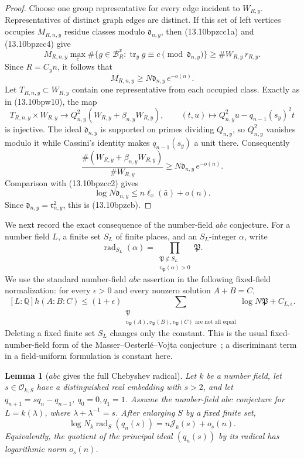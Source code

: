 \documentclass[11pt,reqno]{amsart}
\newtheorem{lemma}[theorem]{Lemma}
\theoremstyle{definition}
\theoremstyle{remark}
\newcommand{\Q}{\mathbb Q}
\newcommand{\cO}{\mathcal O}
\newcommand{\Tr}{\operatorname{tr}}
\begin{document}
\begin{proof}
Choose one group representative for every edge incident to \(W_{R,y}\).
Representatives of distinct graph edges are distinct.  If this set of left
vertices occupies \(M_{R,n,y}\) residue classes modulo
\(\mathfrak d_{n,y}\), then (13.10bpzcc1a) and (13.10bpzcc4) give
\[
 M_{R,n,y}
 \max_c\#\{g\in\mathcal B_R^x:
   \Tr_y g\equiv c\pmod{\mathfrak d_{n,y}}\}
 \ge \#W_{R,y}\,r_{R,y}.
\]
Since \(R=C_yn\), it follows that
\[
 M_{R,n,y}\ge N\mathfrak d_{n,y}\,e^{-o(n)}.
\tag{13.10bpzcc5}
\]
Let \(T_{R,n,y}\subset W_{R,y}\) contain one representative from each
occupied class.  Exactly as in (13.10bpw10), the map
\[
 T_{R,n,y}\times W_{R,y}\longrightarrow
 Q_{n,y}^2(W_{R,y}+\beta_{n,y}W_{R,y}),\qquad
 (t,u)\longmapsto
 Q_{n,y}^2u-q_{n-1}(s_y)^2t
\]
is injective.  The ideal \(\mathfrak d_{n,y}\) is supported on primes
dividing \(Q_{n,y}\), so \(Q_{n,y}^2\) vanishes modulo it while Cassini's
identity makes \(q_{n-1}(s_y)\) a unit there.  Consequently
\[
 \frac{\#(W_{R,y}+\beta_{n,y}W_{R,y})}{\#W_{R,y}}
 \ge N\mathfrak d_{n,y}\,e^{-o(n)}.
\]
Comparison with (13.10bpzcc2) gives
\[
 \log N\mathfrak d_{n,y}
 \le n\ell_x(\bar a)+o(n).
\]
Since \(\mathfrak d_{n,y}=\mathfrak r_{n,y}^2\), this is
(13.10bpzcb).
\end{proof}

We next record the exact consequence of the number-field \(abc\)
conjecture.  For a number field \(L\), a finite set \(S_L\) of finite
places, and an \(S_L\)-integer \(\alpha\), write
\[
 \operatorname{rad}_{S_L}(\alpha)
 =\prod_{\substack{\mathfrak P\notin S_L\\
                    v_{\mathfrak P}(\alpha)>0}}\mathfrak P.
\]
We use the standard number-field \(abc\) assertion in the following
fixed-field normalization: for every \(\epsilon>0\) and every nonzero
solution \(A+B=C\),
\[
 [L:\Q]h(A:B:C)
 \le(1+\epsilon)
 \sum_{\substack{\mathfrak P\\
  v_{\mathfrak P}(A),v_{\mathfrak P}(B),v_{\mathfrak P}(C)
  \text{ are not all equal}}}
 \log N\mathfrak P+C_{L,\epsilon}.
\tag{13.10bpzcc}
\]
Deleting a fixed finite set \(S_L\) changes only the constant.  This is the
usual fixed-number-field form of the Masser--Oesterl\'e--Vojta
conjecture~\cite[p.~84]{VojtaDiophantine}; a discriminant term in a
field-uniform formulation is constant here.

\begin{lemma}[\(abc\) gives the full Chebyshev radical]
\label{lem:abc-chebyshev-radical}
Let \(k\) be a number field, let \(s\in\cO_{k,S}\) have a distinguished
real embedding with \(s>2\), and let
\(q_{n+1}=sq_n-q_{n-1}\), \(q_0=0,q_1=1\).  Assume the number-field
\(abc\) conjecture for \(L=k(\lambda)\), where
\(\lambda+\lambda^{-1}=s\).  After enlarging \(S\) by a fixed finite set,
\[
 \log N_k\operatorname{rad}_S(q_n(s))
 =n\mathcal J_k(s)+o_s(n).
\tag{13.10bpzd}
\]
Equivalently, the quotient of the principal ideal \((q_n(s))\) by its
radical has logarithmic norm \(o_s(n)\).
\end{lemma}
\end{document}
